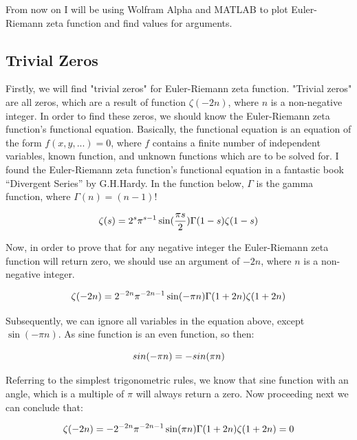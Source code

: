 \documentclass[a4paper]{article}
\begin{document}
From now on I will be using Wolfram Alpha and MATLAB to plot Euler-Riemann zeta function
and find values for arguments.\\

\subsection{Trivial Zeros}

Firstly, we will find "trivial zeros" for Euler-Riemann zeta function. "Trivial zeros" are all zeros,
which are a result of function $\zeta(-2n)$, where $n$ is a non-negative integer. In order to find these
zeros, we should know the Euler-Riemann zeta function's functional equation. Basically, the
functional equation \cite{Func}
is an equation of the form $f(x, y, ... ) = 0$, where $f$ contains a finite number
of independent variables, known function, and unknown functions which are to be solved for. I
found the Euler-Riemann zeta function's functional equation in a fantastic book
“Divergent Series” by G.H.Hardy.\cite{Hardy}
In the function below, $\Gamma$ is the gamma function, where $\Gamma(n) = (n-1)!$

\begin{equation}
  \zeta(s)=2^s\pi^{s-1}\sin(\frac{\pi s}{2})\Gamma(1-s)\zeta(1-s)\\
  \end{equation}

Now, in order to prove that for any negative integer the Euler-Riemann zeta function will return
zero, we should use an argument of $-2n$, where $n$ is a non-negative integer.

\begin{equation}
  \zeta(-2n)=2^{-2n}\pi^{-2n-1}\sin(-\pi n)\Gamma(1+2n)\zeta(1+2n)\\
  \end{equation}

Subsequently, we can ignore all variables in the equation above, except $\sin(-\pi n)$. As sine
function is an even function, so then:

\begin{equation}
  sin(-\pi n)=-sin(\pi n)\\
  \end{equation}

Referring to the simplest trigonometric rules, we know that sine function with an angle, which is a
multiple of $\pi$ will always return a zero. Now proceeding next we can conclude that:

\begin{equation*}
  \zeta(-2n)=-2^{-2n}\pi^{-2n-1}\sin(\pi n)\Gamma(1+2n)\zeta(1+2n)=0\\
  \end{equation*}
\end{document}

